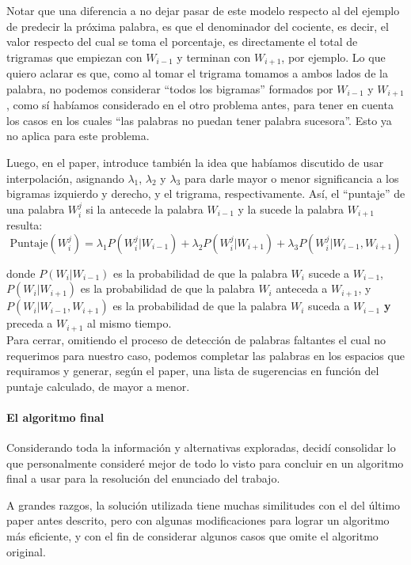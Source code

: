 \documentclass[a4paper]{article}
\begin{document}
Notar que una diferencia a no dejar pasar de este modelo respecto al del ejemplo de predecir la próxima palabra, es que el denominador del cociente, es decir, el valor respecto del cual se toma el porcentaje, es directamente el total de trigramas que empiezan con $W_{i-1}$ y terminan con $W_{i+1}$, por ejemplo. Lo que quiero aclarar es que, como al tomar el trigrama tomamos a ambos lados de la palabra, no podemos considerar ``todos los bigramas'' formados por $W_{i-1}$ y $W_{i+1}$, como sí habíamos considerado en el otro problema antes, para tener en cuenta los casos en los cuales ``las palabras no puedan tener palabra sucesora''. Esto ya no aplica para este problema.

Luego, en el paper, introduce también la idea que habíamos discutido de usar interpolación, asignando $\lambda_1$, $\lambda_2$ y $\lambda_3$ para darle mayor o menor significancia a los bigramas izquierdo y derecho, y el trigrama, respectivamente. Así, el ``puntaje'' de una palabra $W_i^j$ si la antecede la palabra $W_{i-1}$ y la sucede la palabra $W_{i+1}$ resulta:
\[
    \text{Puntaje}(W_i^j) = \lambda_1 P(W_i^j|W_{i-1}) + \lambda_2 P(W_i^j|W_{i+1}) + \lambda_3 P(W_i^j|W_{i-1},W_{i+1})
\]

\noindent donde $P(W_i|W_{i-1})$ es la probabilidad de que la palabra $W_i$ sucede a $W_{i-1}$, $P(W_i|W_{i+1})$ es la probabilidad de que la palabra $W_i$ anteceda a $W_{i+1}$, y $P(W_i|W_{i-1},W_{i+1})$ es la probabilidad de que la palabra $W_i$ suceda a $W_{i-1}$ \textbf{y} preceda a $W_{i+1}$ al mismo tiempo. \\

Para cerrar, omitiendo el proceso de detección de palabras faltantes el cual no requerimos para nuestro caso, podemos completar las palabras en los espacios que requiramos y generar, según el paper, una lista de sugerencias en función del puntaje calculado, de mayor a menor.

\paragraph{El algoritmo final}

Considerando toda la información y alternativas exploradas, decidí consolidar lo que personalmente consideré mejor de todo lo visto para concluir en un algoritmo final a usar para la resolución del enunciado del trabajo.

A grandes razgos, la solución utilizada tiene muchas similitudes con el del último paper antes descrito, pero con algunas modificaciones para lograr un algoritmo más eficiente, y con el fin de considerar algunos casos que omite el algoritmo original. \\
\end{document}
